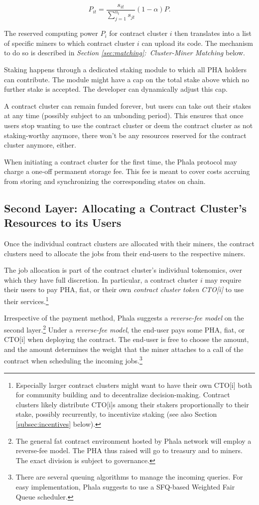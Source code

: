\documentclass[11pt, a4paper, twocolumn]{article}
\begin{document}
\begin{equation*} P_{it} = \frac{s_{it}}{\sum_{j=1}^{n_t} s_{jt}} (1-\alpha)P.\end{equation*}

The reserved computing power $P_i$ for contract cluster $i$ then translates into a list of specific miners to which contract cluster $i$ can upload its code. The mechanism to do so is described in \textit{Section \ref{sec:matching}:~Cluster-Miner Matching} below.

Staking happens through a dedicated staking module to which all PHA holders can contribute. The module might have a cap on the total stake above which no further stake is accepted. The developer can dynamically adjust this cap. 

A contract cluster can remain funded forever, but users can take out their stakes at any time (possibly subject to an unbonding period). This ensures that once users stop wanting to use the contract cluster or deem the contract cluster as not staking-worthy anymore, there won't be any resources reserved for the contract cluster anymore, either.

When initiating a contract cluster for the first time, the Phala protocol may charge a one-off permanent storage fee. This fee is meant to cover costs accruing from storing and synchronizing the corresponding states on chain.  

\subsection{Second Layer: Allocating a Contract Cluster's Resources to its Users} 
Once the individual contract clusters are allocated with their miners, the contract clusters need to allocate the jobs from their end-users to the respective miners. 

The job allocation is part of the contract cluster's individual tokenomics, over which they have full discretion. In particular, a contract cluster $i$ may require their users to pay PHA, fiat, or their own \textit{contract cluster token} \textit{CTO[i]} to use their services.\footnote{%
	Especially larger contract clusters might want to have their own CTO[i] both for community building and to decentralize decision-making. Contract clusters likely distribute CTO[i]s among their stakers proportionally to their stake, possibly recurrently, to incentivize staking (see also Section \ref{subsec:incentives} below).}

Irrespective of the payment method, Phala suggests a \textit{reverse-fee model} on the second layer.\footnote{%
	The general fat contract environment hosted by Phala network will employ a reverse-fee model. The PHA thus raised will go to treasury and to miners. The exact division is subject to governance.}
Under a \textit{reverse-fee model}, the end-user pays some PHA, fiat, or CTO[i] when deploying the contract. The end-user is free to choose the amount, and the amount determines the weight that the miner attaches to a call of the contract when scheduling the incoming jobs.\footnote{%
	There are several queuing algorithms to manage the incoming queries. For easy implementation, Phala suggests to use a SFQ-based Weighted Fair Queue scheduler.}
\end{document}
